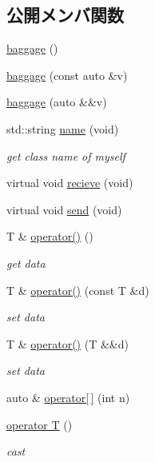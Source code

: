 \subsection*{公開メンバ関数}
\begin{DoxyCompactItemize}
\item 
\hyperlink{classfractal_1_1baggage_a4595c4e784aee7a446ef3e4ec4e25dbf}{baggage} ()
\item 
\hyperlink{classfractal_1_1baggage_a039105816c814c850137eb7ade424899}{baggage} (const auto \&v)
\item 
\hyperlink{classfractal_1_1baggage_ab3ab6b144d0fb9ee68d8f4810a4749f4}{baggage} (auto \&\&v)
\item 
std\+::string \hyperlink{classfractal_1_1baggage_ab9ce449071afe7e188a49d4a0be8d5f1}{name} (void)
\begin{DoxyCompactList}\small\item\em get class name of myself \end{DoxyCompactList}\item 
virtual void \hyperlink{classfractal_1_1baggage_aa7d07fc98f7c76789e6047345b2119ce}{recieve} (void)
\item 
virtual void \hyperlink{classfractal_1_1baggage_a12ef96c1b906369cfeeabdead61c257b}{send} (void)
\item 
T \& \hyperlink{classfractal_1_1baggage_a1ce803eda450dd559aa9b9818b28cf5e}{operator()} ()
\begin{DoxyCompactList}\small\item\em get data \end{DoxyCompactList}\item 
T \& \hyperlink{classfractal_1_1baggage_a3c94a35a361859fd455047a044213d01}{operator()} (const T \&d)
\begin{DoxyCompactList}\small\item\em set data \end{DoxyCompactList}\item 
T \& \hyperlink{classfractal_1_1baggage_a25086cfca4ea2ec94e9ee8965ce335c8}{operator()} (T \&\&d)
\begin{DoxyCompactList}\small\item\em set data \end{DoxyCompactList}\item 
auto \& \hyperlink{classfractal_1_1baggage_a00f2d4993290a8be28c911904637d178}{operator\mbox{[}$\,$\mbox{]}} (int n)
\item 
\hyperlink{classfractal_1_1baggage_a404f89564a219ffceb983cd3c77610e5}{operator T} ()
\begin{DoxyCompactList}\small\item\em cast \end{DoxyCompactList}\item 

\end{DoxyCompactItemize}
